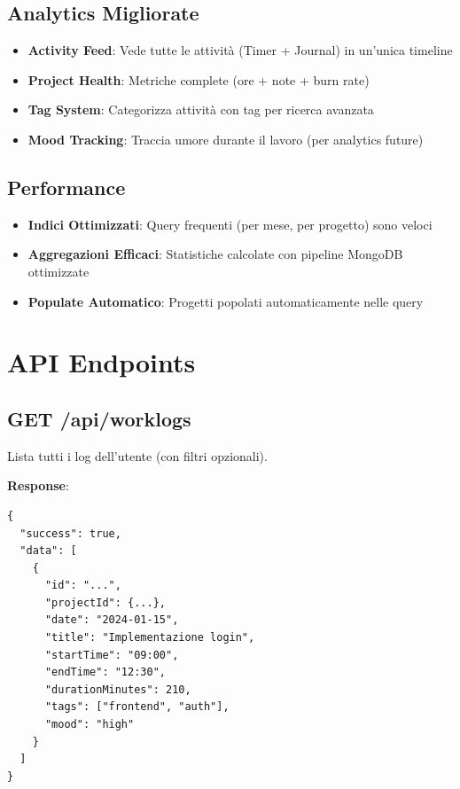 \documentclass[11pt,a4paper]{article}
\begin{document}
\subsection{Analytics Migliorate}

\begin{itemize}
    \item \textbf{Activity Feed}: Vede tutte le attività (Timer + Journal) in un'unica timeline
    \item \textbf{Project Health}: Metriche complete (ore + note + burn rate)
    \item \textbf{Tag System}: Categorizza attività con tag per ricerca avanzata
    \item \textbf{Mood Tracking}: Traccia umore durante il lavoro (per analytics future)
\end{itemize}

\subsection{Performance}

\begin{itemize}
    \item \textbf{Indici Ottimizzati}: Query frequenti (per mese, per progetto) sono veloci
    \item \textbf{Aggregazioni Efficaci}: Statistiche calcolate con pipeline MongoDB ottimizzate
    \item \textbf{Populate Automatico}: Progetti popolati automaticamente nelle query
\end{itemize}

\section{API Endpoints}

\subsection{GET /api/worklogs}

Lista tutti i log dell'utente (con filtri opzionali).

\textbf{Response}:
\begin{lstlisting}
{
  "success": true,
  "data": [
    {
      "id": "...",
      "projectId": {...},
      "date": "2024-01-15",
      "title": "Implementazione login",
      "startTime": "09:00",
      "endTime": "12:30",
      "durationMinutes": 210,
      "tags": ["frontend", "auth"],
      "mood": "high"
    }
  ]
}
\end{lstlisting}
\end{document}
